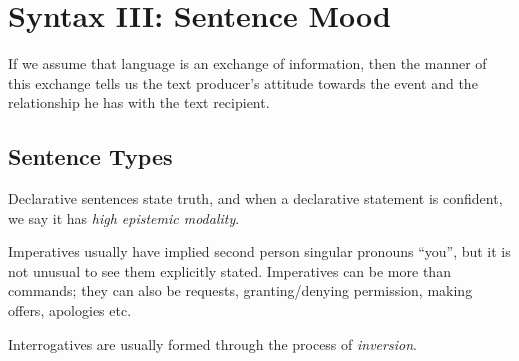 \documentclass[../main.tex]{subfiles}
\begin{document}
	\section{Syntax III: Sentence Mood}
	\begin{preamb}
		If we assume that language is an exchange of information, then the manner of this exchange tells us the text producer's attitude towards the event and the relationship he has with the text recipient.
	\end{preamb}
	
	\subsection{Sentence Types}
		Declarative sentences state truth, and when a declarative statement is confident, we say it has \textit{high epistemic modality}.

		Imperatives usually have implied second person singular pronouns ``you'', but it is not unusual to see them explicitly stated.
		Imperatives can be more than commands; they can also be requests, granting/denying permission, making offers, apologies etc. 

		Interrogatives are usually formed through the process of \textit{inversion}.
\end{document}
